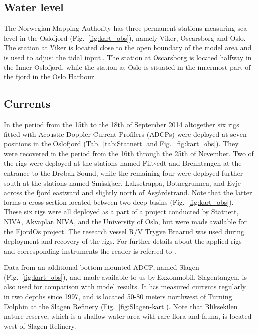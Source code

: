 \newpage

\subsection{Water level}
The Norwegian Mapping Authority has three permanent stations measuring sea level in the Oslofjord (Fig.~\ref{fig:kart_obs}), namely Viker, Oscarsborg and Oslo. The station at Viker is located close to the open boundary of the model area and is used to adjust the tidal input \cite{hjelm:etal:2017}. The station at Oscarsborg is located halfway in the Inner Oslofjord, while the station at Oslo is situated in the innermost part of the fjord in the Oslo Harbour.

\subsection{Currents}

In the period from the 15th to the 18th of September 2014 altogether six rigs fitted with Acoustic Doppler Current Profilers (ADCPs) were deployed at seven positions in the Oslofjord (Tab.~\ref{tab:Statnett} and Fig.~\ref{fig:kart_obs}). They were recovered in the period from the 16th through the 25th of November. Two of the rigs were deployed at the stations named Filtvedt and Brenntangen at the entrance to the Dr{\o}bak Sound, while the remaining four were deployed further south at the stations named Sm{\aa}skj{\ae}r, Laksetrappa, Botnegrunnen, and Evje across the fjord eastward and slightly north of {\AA}sg{\aa}rdstrand. Note that the latter forms a cross section located between two deep basins (Fig.~\ref{fig:kart_obs}).  These six rigs were all deployed as a part of a project conducted by Statnett, NIVA, Akvaplan NIVA, and the University of Oslo, but were made available for the FjordOs project. The research vessel R/V Trygve Braarud was used during deployment and recovery of the rigs. For further details about the applied rigs and corresponding instruments the reader is referred to \cite{staalstrom:2015}.

Data from an additional bottom-mounted ADCP, named Slagen (Fig.~\ref{fig:kart_obs}), and made available to us by Exxonmobil, Slagentangen, is also used for comparison with model results. It has measured currents regularly in two depths since 1997, and is located 50-80 meters northwest of Turning Dolphin at the Slagen Refinery (Fig.~\ref{fig:Slagen-kart}). Note that Bliksekilen nature reserve, which is a shallow water area with rare flora and fauna, is located west of Slagen Refinery. 

